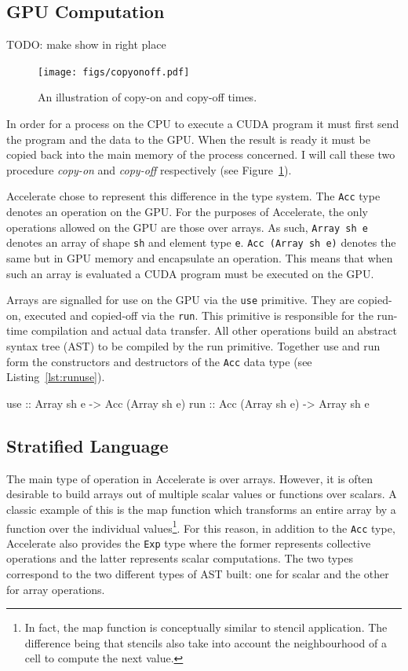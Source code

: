 \documentclass[12pt,a4paper,twoside]{scrbook}
\begin{document}
\subsection{GPU Computation}

TODO: make show in right place
\begin{figure}
  \texttt{[image: figs/copyonoff.pdf]}
  \caption{An illustration of copy-on and copy-off times.}
  \label{fig:copyonoff}
\end{figure}

In order for a process on the CPU to execute a CUDA program it must first send
the program and the data to the GPU. When the result is ready it must be copied
back into the main memory of the process concerned. I will call these two
procedure \emph{copy-on} and \emph{copy-off} respectively (see
Figure~\ref{fig:copyonoff}).

Accelerate chose to represent this difference in the type system. The
\texttt{Acc} type denotes an operation on the GPU. For the purposes of
Accelerate, the only operations allowed on the GPU are those over arrays. As
such, \texttt{Array sh e} denotes an array of shape \texttt{sh} and element type
\texttt{e}.  \texttt{Acc (Array sh e)} denotes the same but in GPU memory and
encapsulate an operation. This means that when such an array is evaluated a CUDA
program must be executed on the GPU.

Arrays are signalled for use on the GPU via the \texttt{use} primitive.  They
are copied-on, executed and copied-off via the \texttt{run}. This primitive is
responsible for the run-time compilation and actual data transfer. All other
operations build an abstract syntax tree (AST) to be compiled by the run
primitive. Together use and run form the constructors and destructors of the
\texttt{Acc} data type (see Listing~\ref{lst:runuse}).

\begin{hflisting}[label={lst:runuse}, caption=The basic constructors and
  destructors for moving arrays too and from the GPU in Accelerate.]
use :: Array sh e -> Acc (Array sh e)
run :: Acc (Array sh e) -> Array sh e
\end{hflisting}

\subsection{Stratified Language}

The main type of operation in Accelerate is over arrays. However, it is often
desirable to build arrays out of multiple scalar values or functions over
scalars. A classic example of this is the map function which transforms an
entire array by a function over the individual values\footnote{In fact, the map
  function is conceptually similar to stencil application. The difference being
  that stencils also take into account the neighbourhood of a cell to compute
  the next value.}. For this reason, in addition to the \texttt{Acc} type,
Accelerate also provides the \texttt{Exp} type where the former represents
collective operations and the latter represents scalar computations. The two
types correspond to the two different types of AST built: one for scalar and the
other for array operations.
\end{document}
